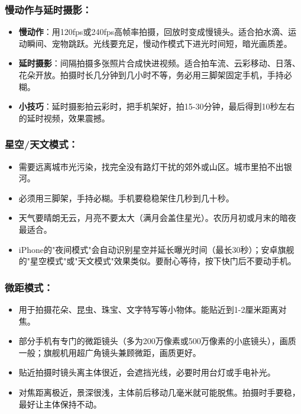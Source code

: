 \subsubsection*{慢动作与延时摄影：}

\begin{itemize}
  \item \textbf{慢动作}：用120fps或240fps高帧率拍摄，回放时变成慢镜头。适合拍水滴、运动瞬间、宠物跳跃。光线要充足，慢动作模式下进光时间短，暗光画质差。
  \item \textbf{延时摄影}：间隔拍摄多张照片合成快进视频。适合拍车流、云彩移动、日落、花朵开放。拍摄时长几分钟到几小时不等，务必用三脚架固定手机，手持必糊。
  \item \textbf{小技巧}：延时摄影拍云彩时，把手机架好，拍15-30分钟，最后得到10秒左右的延时视频，效果震撼。
\end{itemize}

\subsubsection*{星空/天文模式：}

\begin{itemize}
  \item 需要远离城市光污染，找完全没有路灯干扰的郊外或山区。城市里拍不出银河。
  \item 必须用三脚架，手持必糊。手机要稳稳架住几秒到几十秒。
  \item 天气要晴朗无云，月亮不要太大（满月会盖住星光）。农历月初或月末的暗夜最适合。
  \item iPhone的"夜间模式"会自动识别星空并延长曝光时间（最长30秒）；安卓旗舰的"星空模式"或"天文模式"效果类似。要耐心等待，按下快门后不要动手机。
\end{itemize}

\subsubsection*{微距模式：}

\begin{itemize}
  \item 用于拍摄花朵、昆虫、珠宝、文字特写等小物体。能贴近到1-2厘米距离对焦。
  \item 部分手机有专门的微距镜头（多为200万像素或500万像素的小底镜头），画质一般；旗舰机用超广角镜头兼顾微距，画质更好。
  \item 贴近拍摄时镜头离主体很近，会遮挡光线，必要时用台灯或手电补光。
  \item 对焦距离极近，景深很浅，主体前后移动几毫米就可能脱焦。拍摄时手要稳，最好让主体保持不动。
\end{itemize}

